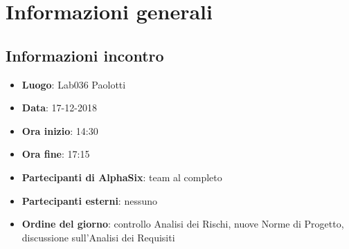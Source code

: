 \newcommand{\documento}{\VI}
\newcommand{\nomedocumentofisico}{VI\_17\_12\_2018.pdf}
\newcommand{\redazione}{\LC}
\newcommand{\verifica}{\CV}
\newcommand{\approvazione}{\MM}
\newcommand{\versione}{1.0.0}
\newcommand{\uso}{Interno}
\newcommand{\destinateTo}{\TV, \\ & \RC, \\ & \II}
\newcommand{\datacreazione}{18 dicembre 2018}
\newcommand{\datamodifica}{19 dicembre 2018}
\newcommand{\stato}{Approvato}

\def\TABELLE{false}	%
\def\FIGURE{false} 	%






    

    
    
	
    
    \section{Informazioni generali}
		\subsection{Informazioni incontro}
			\begin{itemize}
				\item { \textbf{Luogo}: Lab036 Paolotti}
				\item { \textbf{Data}: 17-12-2018}
				\item { \textbf{Ora inizio}: 14:30}
				\item { \textbf{Ora fine}: 17:15}
				\item { \textbf{Partecipanti di AlphaSix}: team al completo}
				\item { \textbf{Partecipanti esterni}: nessuno}
				\item { \textbf{Ordine del giorno}: controllo Analisi dei Rischi, nuove Norme di Progetto, discussione sull'Analisi dei Requisiti}
			\end{itemize}

